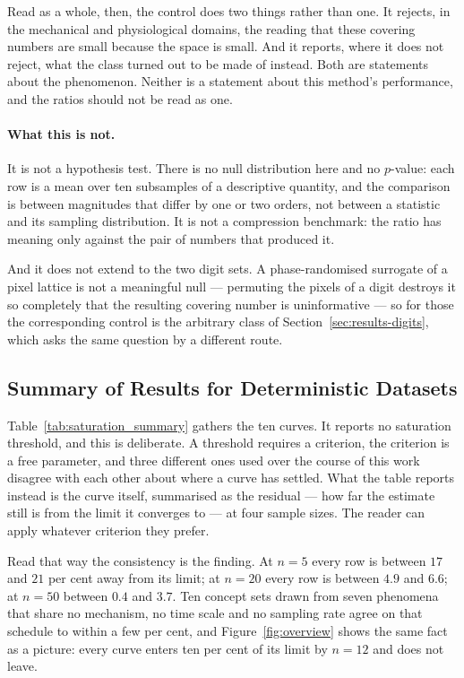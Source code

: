 \documentclass[10pt]{article}
\theoremstyle{plain}
\theoremstyle{definition}
\theoremstyle{remark}
\begin{document}
Read as a whole, then, the control does two things rather than one. It
rejects, in the mechanical and physiological domains, the reading that these
covering numbers are small because the space is small. And it reports, where it
does not reject, what the class turned out to be made of instead. Both are
statements about the phenomenon. Neither is a statement about this method's
performance, and the ratios should not be read as one.

\paragraph{What this is not.}
It is not a hypothesis test. There is no null distribution here and no $p$-value:
each row is a mean over ten subsamples of a descriptive quantity, and the
comparison is between magnitudes that differ by one or two orders, not between
a statistic and its sampling distribution. It is not a compression benchmark: the
ratio has meaning only against the pair of numbers that produced it.

And it does not extend to the two digit sets. A phase-randomised surrogate of a
pixel lattice is not a meaningful null --- permuting the pixels of a digit
destroys it so completely that the resulting covering number is uninformative
--- so for those the corresponding control is the arbitrary class of
Section~\ref{sec:results-digits}, which asks the same question by a different
route.

\subsection{Summary of Results for Deterministic Datasets}

Table~\ref{tab:saturation_summary} gathers the ten curves. It reports no
saturation threshold, and this is deliberate. A threshold requires a criterion,
the criterion is a free parameter, and three different ones used over the course
of this work disagree with each other about where a curve has settled. What the
table reports instead is the curve itself, summarised as the residual --- how
far the estimate still is from the limit it converges to --- at four sample
sizes. The reader can apply whatever criterion they prefer.

Read that way the consistency is the finding. At $n=5$ every row is between
$17$ and $21$ per cent away from its limit; at $n=20$ every row is between $4.9$
and $6.6$; at $n=50$ between $0.4$ and $3.7$. Ten concept sets drawn from seven
phenomena that share no mechanism, no time scale and no sampling rate agree on
that schedule to within a few per cent, and Figure~\ref{fig:overview} shows the
same fact as a picture: every curve enters ten per cent of its limit by $n=12$
and does not leave.
\end{document}

